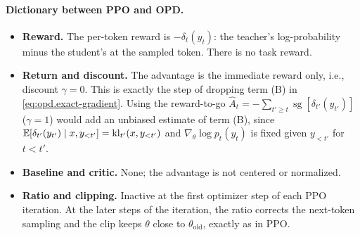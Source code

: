 \paragraph{Dictionary between PPO and OPD.}
\begin{itemize}
    \item \textbf{Reward.} The per-token reward is $-\delta_t(y_t)$: the teacher's
    log-probability minus the student's at the sampled token. There is no task reward.
    \item \textbf{Return and discount.} The advantage is the immediate reward only, i.e.,
    discount $\gamma=0$. This is exactly the step of dropping term (B) in
    \eqref{eq:opd.exact-gradient}. Using the reward-to-go
    $\hat A_t=-\sum_{t'\geq t}\operatorname{sg}[\delta_{t'}(y_{t'})]$ ($\gamma=1$) would add an
    unbiased estimate of term (B), since
    $\mathbb{E}[\delta_{t'}(y_{t'})\mid x,y_{<t'}]=\mathrm{kl}_{t'}(x,y_{<t'})$ and
    $\nabla_\theta\log p_t(y_t)$ is fixed given $y_{<t'}$ for $t<t'$.
    \item \textbf{Baseline and critic.} None; the advantage is not centered or normalized.
    \item \textbf{Ratio and clipping.} Inactive at the first optimizer step of each PPO
    iteration. At the later steps of the iteration, the ratio corrects the next-token
    sampling and the clip keeps $\theta$ close to $\theta_{\mathrm{old}}$, exactly as in PPO.
\end{itemize}

